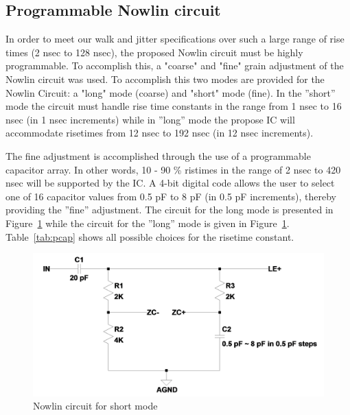 \documentclass[12pt,oneside,final]{siuethesis}
\theoremstyle{definition}
\begin{document}
\subsection{Programmable Nowlin circuit}
\par In order to meet our walk and jitter specifications over such a large range of rise times (2 nsec to 128 nsec), the proposed Nowlin circuit must be highly programmable. To accomplish this, a "coarse" and "fine" grain adjustment of the Nowlin circuit was used. To accomplish this two modes are provided for the Nowlin Circuit: a "long" mode (coarse) and "short" mode (fine). In the ”short” mode the circuit must handle rise time constants in the range from 1 nsec to 16 nsec (in 1 nsec increments) while in ”long” mode the propose IC will accommodate risetimes from 12 nsec to 192 nsec (in 12 nsec increments).
\par The fine adjustment is accomplished through the use of a programmable capacitor array. In other words, 10 - 90 \% ristimes in the range of 2 nsec to 420 nsec will be supported by the IC. A 4-bit digital code allows the user to select one of 16 capacitor values from 0.5 pF to 8 pF (in 0.5 pF increments), thereby providing the ”fine” adjustment. The circuit for the long mode is presented in Figure~\ref{fig:Nowlinshort} while the circuit for the ”long” mode is given in Figure~\ref{fig:Nowlinshort}. Table~\ref{tab:pcap} shows all possible choices for the risetime constant.

\begin{figure}[htbp!]
\centering
\includegraphics[scale=.27,keepaspectratio=true]{../LTspice_Drawings/nowlin/nowlin_short.png} 
\caption{Nowlin circuit for short mode}
\label{fig:Nowlinshort}
\end{figure}
\end{document}
